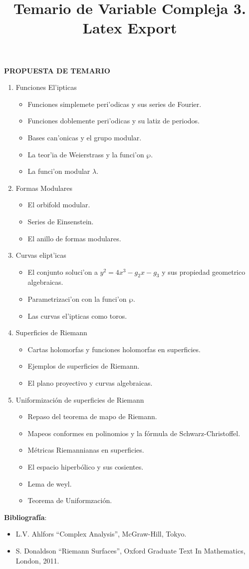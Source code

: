 \documentclass[letterpaper]{article}
\title{Temario de Variable Compleja 3. Latex Export}
\begin{document}
\maketitle

\noindent \textbf{PROPUESTA DE TEMARIO}
\begin{enumerate}
\item Funciones El'ipticas
\begin{itemize}
\item Funciones simplemete peri'odicas y sus series de Fourier.
\item Funciones doblemente peri'odicas y su latiz de periodos.
\item Bases can'onicas y el grupo modular.
\item La teor'ia de Weierstrass y la funci'on \(\wp\).
\item La funci'on modular \(\lambda\).
\end{itemize}

\item Formas Modulares
\begin{itemize}
\item El orbifold modular.
\item Series de Einsenstein.
\item El anillo de formas modulares.
\end{itemize}

\item Curvas elipt'icas
\begin{itemize}
\item El conjunto soluci'on a \(y^2=4x^3-g_2x-g_3\) y sus propiedad geometrico algebraicas.
\item Parametrizaci'on con la funci'on \(\wp\).
\item Las curvas el'ipticas como toros.
\end{itemize}

\item Superficies de Riemann
\begin{itemize}
\item Cartas holomorfas y funciones holomorfas en superficies.
\item Ejemplos de superficies de Riemann.
\item El plano proyectivo y curvas algebraicas.
\end{itemize}

\item Uniformización de superficies de Riemann
\begin{itemize}
\item Repaso del teorema de mapo de Riemann.
\item Mapeos conformes en polinomios y la fórmula de Schwarz-Christoffel.
\item Métricas Riemannianas en superficies.
\item El espacio hiperbólico y sus cosientes.
\item Lema de weyl.
\item Teorema de Uniformzación.
\end{itemize}
\end{enumerate}

\textbf{Bibliografía}:

\begin{itemize}
\item L.V. Ahlfors ``Complex Analysis'', McGraw-Hill, Tokyo.
\item S. Donaldson ``Riemann Surfaces'', Oxford Graduate Text In Mathematics, London, 2011.
\end{itemize}
\end{document}
